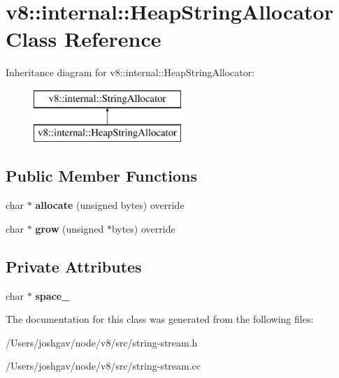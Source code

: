 \hypertarget{classv8_1_1internal_1_1_heap_string_allocator}{}\section{v8\+:\+:internal\+:\+:Heap\+String\+Allocator Class Reference}
\label{classv8_1_1internal_1_1_heap_string_allocator}
Inheritance diagram for v8\+:\+:internal\+:\+:Heap\+String\+Allocator\+:\begin{figure}[H]
\begin{center}
\leavevmode
\includegraphics[height=2.000000cm]{classv8_1_1internal_1_1_heap_string_allocator}
\end{center}
\end{figure}
\subsection*{Public Member Functions}
\begin{DoxyCompactItemize}
\item 
char $\ast$ {\bfseries allocate} (unsigned bytes) override\hypertarget{classv8_1_1internal_1_1_heap_string_allocator_ada8e942b45db2f819ffb9e3ef587ef1d}{}\label{classv8_1_1internal_1_1_heap_string_allocator_ada8e942b45db2f819ffb9e3ef587ef1d}

\item 
char $\ast$ {\bfseries grow} (unsigned $\ast$bytes) override\hypertarget{classv8_1_1internal_1_1_heap_string_allocator_afa64b8cd01c8a9000e09d37865f13bfd}{}\label{classv8_1_1internal_1_1_heap_string_allocator_afa64b8cd01c8a9000e09d37865f13bfd}

\end{DoxyCompactItemize}
\subsection*{Private Attributes}
\begin{DoxyCompactItemize}
\item 
char $\ast$ {\bfseries space\+\_\+}\hypertarget{classv8_1_1internal_1_1_heap_string_allocator_a4d6602ac3023d9507a337286184f9314}{}\label{classv8_1_1internal_1_1_heap_string_allocator_a4d6602ac3023d9507a337286184f9314}

\end{DoxyCompactItemize}


The documentation for this class was generated from the following files\+:\begin{DoxyCompactItemize}
\item 
/\+Users/joshgav/node/v8/src/string-\/stream.\+h\item 
/\+Users/joshgav/node/v8/src/string-\/stream.\+cc\end{DoxyCompactItemize}

